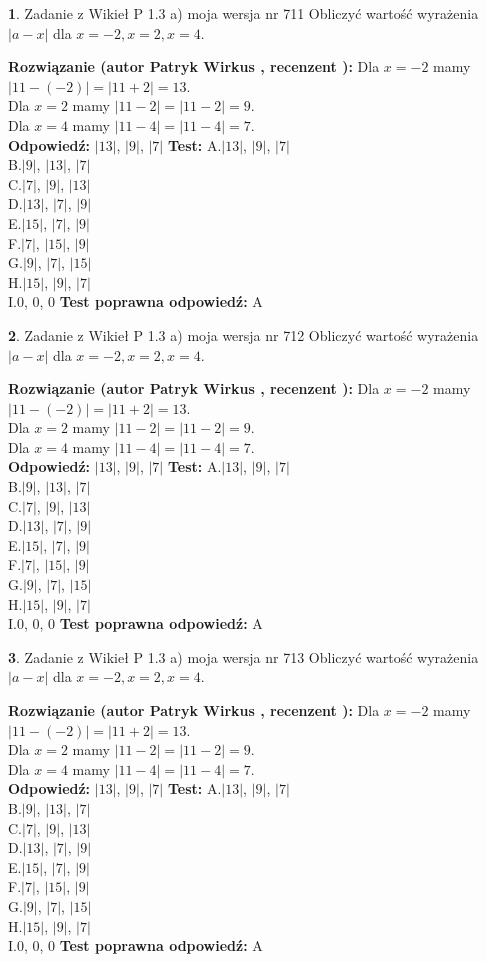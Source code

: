 \documentclass[12pt, a4paper]{article}
\theoremstyle{definition} %
\newtheorem{zad}{}
\newcommand{\zadStart}[1]{\begin{zad}#1\newline}
\newcommand{\zadStop}{\end{zad}}
\newcommand{\rozwStart}[2]{\noindent \textbf{Rozwiązanie (autor #1 , recenzent #2): }\newline}
\newcommand{\rozwStop}{\newline}
\newcommand{\odpStart}{\noindent \textbf{Odpowiedź:}\newline}
\newcommand{\odpStop}{\newline}
\newcommand{\testStart}{\noindent \textbf{Test:}\newline}
\newcommand{\testStop}{\newline}
\newcommand{\kluczStart}{\noindent \textbf{Test poprawna odpowiedź:}\newline}
\newcommand{\kluczStop}{\newline}
\begin{document}
\zadStart{Zadanie z Wikieł P 1.3 a) moja wersja nr 711}
Obliczyć wartość wyrażenia $|a - x|$ dla $x=-2,x=2,x=4$.
\zadStop
\rozwStart{Patryk Wirkus}{}
Dla $x = -2$ mamy $|11 - (-2)| = |11 + 2| = 13$.\\
Dla $x = 2$ mamy $|11 - 2| = |11 - 2| = 9$.\\
Dla $x = 4$ mamy $|11 - 4| = |11 - 4| = 7$.\\
\rozwStop
\odpStart
$|13|$, $|9|$, $|7|$
\odpStop
\testStart
A.$|13|$, $|9|$, $|7|$\\
B.$|9|$, $|13|$, $|7|$\\
C.$|7|$, $|9|$, $|13|$\\
D.$|13|$, $|7|$, $|9|$\\
E.$|15|$, $|7|$, $|9|$\\
F.$|7|$, $|15|$, $|9|$\\
G.$|9|$, $|7|$, $|15|$\\
H.$|15|$, $|9|$, $|7|$\\
I.$0$, $0$, $0$
\testStop
\kluczStart
A
\kluczStop



\zadStart{Zadanie z Wikieł P 1.3 a) moja wersja nr 712}
Obliczyć wartość wyrażenia $|a - x|$ dla $x=-2,x=2,x=4$.
\zadStop
\rozwStart{Patryk Wirkus}{}
Dla $x = -2$ mamy $|11 - (-2)| = |11 + 2| = 13$.\\
Dla $x = 2$ mamy $|11 - 2| = |11 - 2| = 9$.\\
Dla $x = 4$ mamy $|11 - 4| = |11 - 4| = 7$.\\
\rozwStop
\odpStart
$|13|$, $|9|$, $|7|$
\odpStop
\testStart
A.$|13|$, $|9|$, $|7|$\\
B.$|9|$, $|13|$, $|7|$\\
C.$|7|$, $|9|$, $|13|$\\
D.$|13|$, $|7|$, $|9|$\\
E.$|15|$, $|7|$, $|9|$\\
F.$|7|$, $|15|$, $|9|$\\
G.$|9|$, $|7|$, $|15|$\\
H.$|15|$, $|9|$, $|7|$\\
I.$0$, $0$, $0$
\testStop
\kluczStart
A
\kluczStop



\zadStart{Zadanie z Wikieł P 1.3 a) moja wersja nr 713}
Obliczyć wartość wyrażenia $|a - x|$ dla $x=-2,x=2,x=4$.
\zadStop
\rozwStart{Patryk Wirkus}{}
Dla $x = -2$ mamy $|11 - (-2)| = |11 + 2| = 13$.\\
Dla $x = 2$ mamy $|11 - 2| = |11 - 2| = 9$.\\
Dla $x = 4$ mamy $|11 - 4| = |11 - 4| = 7$.\\
\rozwStop
\odpStart
$|13|$, $|9|$, $|7|$
\odpStop
\testStart
A.$|13|$, $|9|$, $|7|$\\
B.$|9|$, $|13|$, $|7|$\\
C.$|7|$, $|9|$, $|13|$\\
D.$|13|$, $|7|$, $|9|$\\
E.$|15|$, $|7|$, $|9|$\\
F.$|7|$, $|15|$, $|9|$\\
G.$|9|$, $|7|$, $|15|$\\
H.$|15|$, $|9|$, $|7|$\\
I.$0$, $0$, $0$
\testStop
\kluczStart
A
\kluczStop
\end{document}
